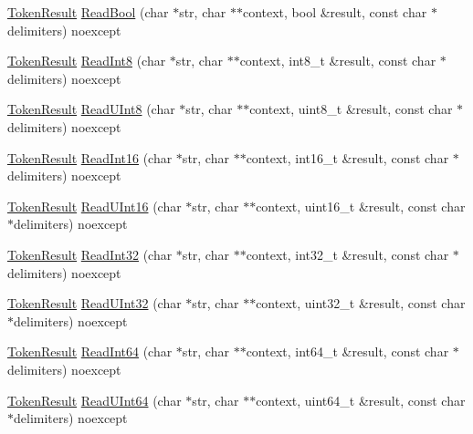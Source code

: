 \begin{DoxyCompactItemize}
\item 
\hyperlink{namespacemage_a2178ba2411db5912f41b2e7698c2037d}{Token\+Result} \hyperlink{namespacemage_a9591f4f03012542cec1fffa8c071cabb}{Read\+Bool} (char $\ast$str, char $\ast$$\ast$context, bool \&result, const char $\ast$delimiters) noexcept
\item 
\hyperlink{namespacemage_a2178ba2411db5912f41b2e7698c2037d}{Token\+Result} \hyperlink{namespacemage_abe11cf387c95aeaa7b2a0d9dd52c2156}{Read\+Int8} (char $\ast$str, char $\ast$$\ast$context, int8\+\_\+t \&result, const char $\ast$delimiters) noexcept
\item 
\hyperlink{namespacemage_a2178ba2411db5912f41b2e7698c2037d}{Token\+Result} \hyperlink{namespacemage_a501bf59af15416c2b9512d3c0b71877f}{Read\+U\+Int8} (char $\ast$str, char $\ast$$\ast$context, uint8\+\_\+t \&result, const char $\ast$delimiters) noexcept
\item 
\hyperlink{namespacemage_a2178ba2411db5912f41b2e7698c2037d}{Token\+Result} \hyperlink{namespacemage_a1c9276dcd75a7fccd76782cfb08952b7}{Read\+Int16} (char $\ast$str, char $\ast$$\ast$context, int16\+\_\+t \&result, const char $\ast$delimiters) noexcept
\item 
\hyperlink{namespacemage_a2178ba2411db5912f41b2e7698c2037d}{Token\+Result} \hyperlink{namespacemage_a0386f953f84184fea2781373638d3736}{Read\+U\+Int16} (char $\ast$str, char $\ast$$\ast$context, uint16\+\_\+t \&result, const char $\ast$delimiters) noexcept
\item 
\hyperlink{namespacemage_a2178ba2411db5912f41b2e7698c2037d}{Token\+Result} \hyperlink{namespacemage_a89e10af340de9a2f3bbc863c26f34f47}{Read\+Int32} (char $\ast$str, char $\ast$$\ast$context, int32\+\_\+t \&result, const char $\ast$delimiters) noexcept
\item 
\hyperlink{namespacemage_a2178ba2411db5912f41b2e7698c2037d}{Token\+Result} \hyperlink{namespacemage_a8bb1ec15b95e4ff3a73359f8ffa5cfed}{Read\+U\+Int32} (char $\ast$str, char $\ast$$\ast$context, uint32\+\_\+t \&result, const char $\ast$delimiters) noexcept
\item 
\hyperlink{namespacemage_a2178ba2411db5912f41b2e7698c2037d}{Token\+Result} \hyperlink{namespacemage_a181fcd7c6f978530b5c98509cb2e9375}{Read\+Int64} (char $\ast$str, char $\ast$$\ast$context, int64\+\_\+t \&result, const char $\ast$delimiters) noexcept
\item 
\hyperlink{namespacemage_a2178ba2411db5912f41b2e7698c2037d}{Token\+Result} \hyperlink{namespacemage_ab6ce2a3c30778cf88f4da68bb6ba343e}{Read\+U\+Int64} (char $\ast$str, char $\ast$$\ast$context, uint64\+\_\+t \&result, const char $\ast$delimiters) noexcept
$$
\end{DoxyCompactItemize}
